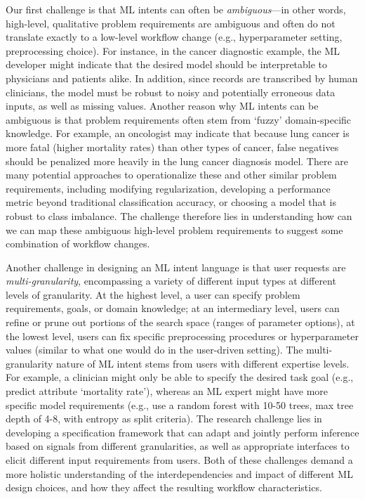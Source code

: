 \documentclass[11pt,dvipdfmx]{article}
\newcommand{\topic}[1]{\vspace{-3.5pt}\smallskip \smallskip \noindent{\bf #1.}}
\begin{document}
\topic{Ambiguous Intents}
Our first challenge is that ML intents can often be \emph{ambiguous}---in other words, high-level, qualitative problem requirements are ambiguous and often do not translate exactly to a low-level workflow change (e.g., hyperparameter setting, preprocessing choice). For instance, in the cancer diagnostic example, the ML developer might indicate that the desired model should be interpretable to physicians and patients alike. In addition, since records are transcribed by human clinicians, the model must be robust to noisy and potentially erroneous data inputs, as well as missing values.  Another reason why ML intents can be ambiguous is that problem requirements often stem from `fuzzy' domain-specific knowledge. For example, an oncologist may indicate that because lung cancer is more fatal (higher mortality rates) than other types of cancer, false negatives should be penalized more heavily in the lung cancer diagnosis model. There are many potential approaches to operationalize these and other similar problem requirements, including modifying regularization, developing a performance metric beyond traditional classification accuracy, or choosing a model that is robust to class imbalance. The challenge therefore lies in understanding how can we can map these ambiguous high-level problem requirements to suggest some combination of workflow changes.

\topic{Multi-Granularity Intents}
Another challenge in designing an ML intent language is that user requests are \emph{multi-granularity}, encompassing a variety of different input types at different levels of granularity. At the highest level, a user can specify problem requirements, goals, or domain knowledge; at an intermediary level, users can refine or prune out portions of the search space (ranges of parameter options), at the lowest level, users can fix specific preprocessing procedures or hyperparameter values (similar to what one would do in the user-driven setting). The multi-granularity nature of ML intent stems from users with different expertise levels. For example, a clinician might only be able to specify the desired task goal (e.g., predict attribute `mortality rate'), whereas an ML expert might have more specific model requirements (e.g., use a random forest with 10-50 trees, max tree depth of 4-8, with entropy as split criteria). The research challenge lies in developing a specification framework that can adapt and jointly perform inference based on signals from different granularities, as well as appropriate interfaces to elicit different input requirements from users. Both of these challenges demand a more holistic understanding of the interdependencies and impact of different ML design choices, and how they affect the resulting workflow characteristics.
\end{document}
